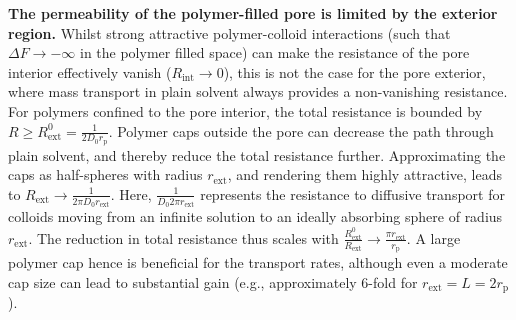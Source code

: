 \documentclass[12pt, a4paper]{article}
\begin{document}
\textbf{The permeability of the polymer-filled pore is limited by the exterior region.}
Whilst strong attractive polymer-colloid interactions (such that $\Delta F \to -\infty$ in the polymer filled space) can make the resistance of the pore interior effectively vanish ($R_{\text{int}} \to 0$), this is not the case for the pore exterior, where mass transport in plain solvent always provides a non-vanishing resistance.
For polymers confined to the pore interior, the total resistance is bounded by $R \geq R_{\text{ext}}^{0} = \frac{1}{2 D_0 r_{\text{p}}}$.
Polymer caps outside the pore can decrease the path through plain solvent, and thereby reduce the total resistance further. Approximating the caps as half-spheres with radius $r_{\text{ext}}$, and rendering them highly attractive, leads to $R_{\text{ext}} \to \frac{1}{2 \pi D_0 r_{\text{ext}}}$.
Here, $\frac{1}{D_0 2 \pi r_{\text{ext}}}$ represents the resistance to diffusive transport for colloids moving from an infinite solution to an ideally absorbing sphere of radius $r_{\text{ext}}$.
The reduction in total resistance thus scales with $\frac{R_{\text{ext}}^{0}}{R_{\text{ext}}} \to \frac{\pi r_{\text{ext}}}{r_{\text{p}}}$.
A large polymer cap hence is beneficial for the transport rates, although even a moderate cap size can lead to substantial gain (e.g., approximately 6-fold for $r_{\text{ext}} = L = 2r_{\text{p}}$). 

\end{document}
